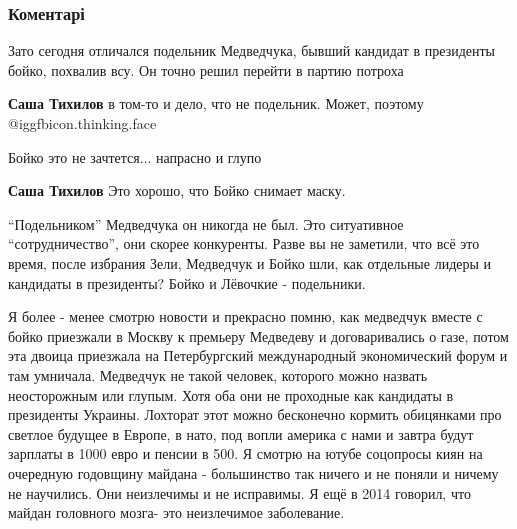  
 
 
 
 
\subsubsection{Коментарі}
\label{sec:06_12_2021.fb.zharkih_denis.1.vojny_ne_budet_huzhe.cmt}

\begin{itemize} %

Зато сегодня отличался подельник Медведчука, бывший кандидат в президенты
бойко, похвалив всу. Он точно решил перейти в партию потроха

\begin{itemize} %
\textbf{Саша Тихилов} в том-то и дело, что не подельник. Может, поэтому  @igg{fbicon.thinking.face} 

Бойко это не зачтется... напрасно и глупо

\textbf{Саша Тихилов}
Это хорошо, что Бойко снимает маску.

\enquote{Подельником} Медведчука он никогда не был. Это ситуативное \enquote{сотрудничество},
они скорее конкуренты. Разве вы не заметили, что всё это время, после избрания
Зели, Медведчук и Бойко шли, как отдельные лидеры и кандидаты в президенты?
Бойко и Лёвочкие - подельники.



Я более - менее смотрю новости и прекрасно помню, как медведчук вместе с бойко
приезжали в Москву к премьеру Медведеву и договаривались о газе, потом эта
двоица приезжала на Петербургский международный экономический форум и там
умничала. Медведчук не такой человек, которого можно назвать неосторожным или
глупым. Хотя оба они не проходные как кандидаты в президенты Украины. Лохторат
этот можно бесконечно кормить обицянками про светлое будущее в Европе, в нато,
под вопли америка с нами и завтра будут зарплаты в 1000 евро и пенсии в 500. Я
смотрю на ютубе соцопросы киян на очередную годовщину майдана - большинство так
ничего и не поняли и ничему не научились. Они неизлечимы и не исправимы. Я ещё
в 2014 говорил, что майдан головного мозга- это неизлечимое заболевание.
\end{itemize} %


\end{itemize}
